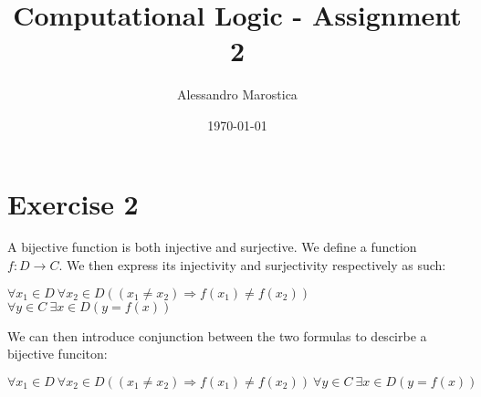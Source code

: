 \documentclass[11pt]{exam}
\title{Computational Logic - Assignment 2}
\author{Alessandro Marostica}
\date{\today}
\begin{document}
\maketitle
\section*{Exercise 2}
A bijective function is both injective and surjective.
We define a function \(f: D \rightarrow C\). We then express its injectivity and surjectivity respectively as such:
\\
\begin{center}
    \(\forall x_1 \in D \  \forall x_2 \in D((x_1 \neq x_2) \Longrightarrow f(x_1) \neq f(x_2)) \)
    \\
    \(\forall y \in C \  \exists x \in D(y = f(x))\)
\end{center}
We can then introduce conjunction between the two formulas to descirbe a bijective funciton:
\begin{center}
    \(\forall x_1 \in D \  \forall x_2 \in D((x_1 \neq x_2) \Longrightarrow f(x_1) \neq f(x_2)) \  \forall y \in C \  \exists x \in D(y = f(x))\)
\end{center}
\end{document}
